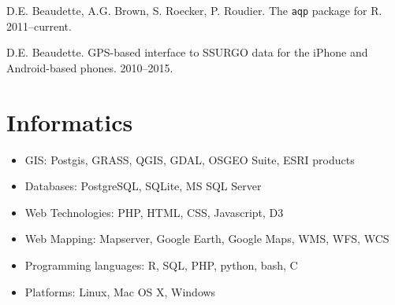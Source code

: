 \documentclass[overlapped,line,10pt,letterpaper]{res}
\begin{document}
\begin{resume}
D.E. Beaudette, A.G. Brown, S. Roecker, P. Roudier. The \texttt{aqp} package for R. 2011--current.

D.E. Beaudette. GPS-based interface to SSURGO data for the iPhone and Android-based phones. 2010--2015.






\section{\bf Informatics}
\begin{itemize}[itemsep=0.05cm,leftmargin=*]
	\item GIS: Postgis, GRASS, QGIS, GDAL, OSGEO Suite, ESRI products
	\item Databases: PostgreSQL, SQLite, MS SQL Server
	\item Web Technologies: PHP, HTML, CSS, Javascript, D3
	\item Web Mapping: Mapserver, Google Earth, Google Maps, WMS, WFS, WCS
	\item Programming languages: R, SQL, PHP, python, bash, C
	\item Platforms: Linux, Mac OS X, Windows
\end{itemize}



\end{resume}
\end{document}
